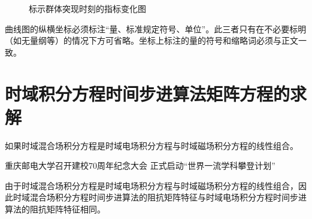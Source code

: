 \documentclass{cqupt_thesis}
\begin{document}
	
	\begin{figure}[H]
		\centering
		
		
		\centering
		\caption{ 标示群体突现时刻的指标变化图\cite{陈浩元2015gb} }
	\end{figure}
	曲线图的纵横坐标必须标注“量、标准规定符号、单位”。此三者只有在不必要标明（如无量纲等）的情况下方可省略。坐标上标注的量的符号和缩略词必须与正文一致。

    \section{时域积分方程时间步进算法矩阵方程的求解}
    \begin{theorem}
        如果时域混合场积分方程是时域电场积分方程与时域磁场积分方程的线性组合。
    \end{theorem}

    重庆邮电大学召开建校70周年纪念大会 正式启动“世界一流学科攀登计划”

    \begin{pproof}
        由于时域混合场积分方程是时域电场积分方程与时域磁场积分方程的线性组合，因此时域混合场积分方程时间步进算法的阻抗矩阵特征与时域电场积分方程时间步进算法的阻抗矩阵特征相同。
    \end{pproof}
\end{document}
